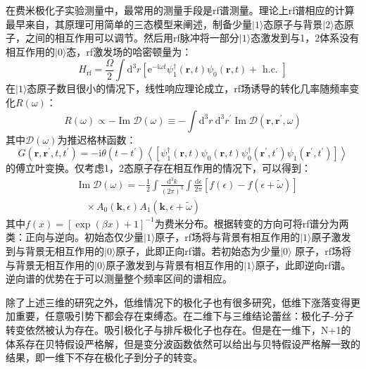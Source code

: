 在费米极化子实验测量中，最常用的测量手段是rf谱测量。理论上rf谱相应的计算最早来自\cite{Massignan2008Twin}，其原理可用简单的三态模型来阐述，制备少量$|1\rangle$态原子与背景$|2\rangle$态原子，之间的相互作用可以调节。然后用rf脉冲将一部分$|1\rangle$态激发到与1，2体系没有相互作用的$|0\rangle$态，rf激发场的哈密顿量为：
\begin{equation}
H_{\mathrm{rf}}=\frac{\Omega}{2} \int \mathrm{d}^{3} r\left[\mathrm{e}^{-\mathrm{i} \omega t} \psi_{1}^{\dagger}(\boldsymbol{r}, t) \psi_{0}(\boldsymbol{r}, t)+\text { h.c. }\right]
\end{equation}
在$|1\rangle$态原子数目很小的情况下，线性响应理论成立，rf场诱导的转化几率随频率变化$R(\omega)$：
\begin{equation}
R(\omega) \propto-\operatorname{Im} \mathcal{D}(\omega) \equiv-\int \mathrm{d}^{3} r \mathrm{~d}^{3} r^{\prime} \operatorname{Im} \mathcal{D}\left(\boldsymbol{r}, \boldsymbol{r}^{\prime}, \omega\right)
\end{equation}
其中$\mathcal{D}(\omega)$为推迟格林函数：
\begin{equation}
G(\boldsymbol{r},\boldsymbol{r}^{\prime},t,t^{\prime}) = -\mathrm{i} \theta\left(t-t^{\prime}\right)\left\langle\left[\psi_{1}^{\dagger}(\boldsymbol{r}, t) \psi_{0}(\boldsymbol{r}, t)\right.\right.\left.\left.\psi_{0}^{\dagger}\left(\boldsymbol{r}^{\prime}, t^{\prime}\right) \psi_{1}\left(\boldsymbol{r}^{\prime}, t^{\prime}\right)\right]\right\rangle
\end{equation}
的傅立叶变换。仅考虑1，2态原子存在相互作用的情况下，可以得到：
\begin{equation}
\begin{split}
&\operatorname{Im} \mathcal{D}(\omega)=-\frac{1}{2} \int \frac{\mathrm{d}^{3} k}{(2 \pi)^{3}} \int \frac{\mathrm{d} \epsilon}{2 \pi}[f(\epsilon)-f(\epsilon+\tilde{\omega})] \\
&\quad \times A_{0}(\boldsymbol{k}, \epsilon) A_{1}(\boldsymbol{k}, \epsilon+\tilde{\omega})
\end{split}
\end{equation}
其中$f(x)=[\exp (\beta x)+1]^{-1}$为费米分布。根据转变的方向可将rf谱分为两类：正向与逆向。初始态仅少量$|1\rangle$原子，rf场将与背景有相互作用的$|1\rangle$原子激发到与背景无相互作用的$|0\rangle$原子，此即正向rf谱。若初始态为少量$|0\rangle$
原子，rf场将与背景无相互作用的$|0\rangle$原子激发到与背景有相互作用的$|1\rangle$原子，此即逆向rf谱。逆向谱的优势在于可以测量整个频率区间的谱相应。


除了上述三维的研究之外，低维情况下的极化子也有很多研究，低维下涨落变得更加重要，任意吸引势下都会存在束缚态。在二维下与三维结论蕾丝：极化子-分子转变依然被认为存在\cite{Zollner2011Polarons,Parish2011pm,Lewenstein2013spinchain012High}。吸引极化子与排斥极化子也存在\cite{Schmidt2012fermi,Ngampruetikorn_2012}。但是在一维下，N+1的体系存在贝特假设严格解\cite{mcguire1965interacting,mcguire1966interacting}，但是变分波函数依然可以给出与贝特假设严格解一致的结果，即一维下不存在极化子到分子的转变\cite{Giraud2009highly,Leskinen_2010,Astrakharchik2013trapped}。


